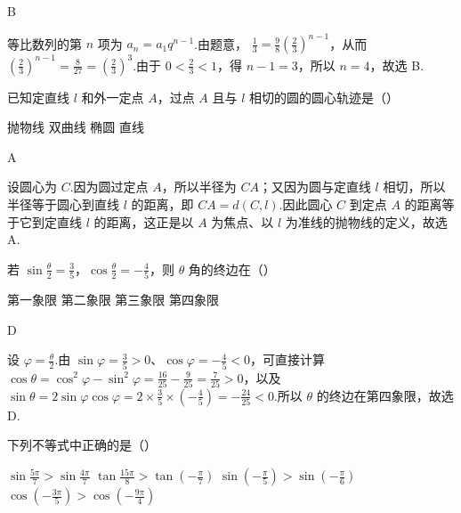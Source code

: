 \documentclass[UTF8,a4paper,oneside,11pt]{ctexbook}
\begin{document}
\begin{answer}
B
\end{answer}

\begin{solution}
等比数列的第 \(n\) 项为 \(a_n=a_1q^{n-1}\).由题意，
\(\frac{1}{3}=\frac{9}{8}\left(\frac{2}{3}\right)^{n-1}\)，从而
\(\left(\frac{2}{3}\right)^{n-1}=\frac{8}{27}=\left(\frac{2}{3}\right)^3\).由于 \(0<\frac{2}{3}<1\)，得 \(n-1=3\)，所以 \(n=4\)，故选 B.
\end{solution}

\begin{problem}

已知定直线 \(l\) 和外一定点 \(A\)，过点 \(A\) 且与 \(l\) 相切的圆的圆心轨迹是（\quad）

\choices
    {抛物线}
    {双曲线}
    {椭圆}
    {直线}
\end{problem}

\begin{answer}
A
\end{answer}

\begin{solution}
设圆心为 \(C\).因为圆过定点 \(A\)，所以半径为 \(CA\)；又因为圆与定直线 \(l\) 相切，所以半径等于圆心到直线 \(l\) 的距离，即
\(CA=d(C,l)\).因此圆心 \(C\) 到定点 \(A\) 的距离等于它到定直线 \(l\) 的距离，这正是以 \(A\) 为焦点、以 \(l\) 为准线的抛物线的定义，故选 A.
\end{solution}

\begin{problem}

若 \(\sin \frac{\theta}{2}=\frac{3}{5}\)，\(\cos \frac{\theta}{2}=-\frac{4}{5}\)，则 \(\theta\) 角的终边在（\quad）

\choices
    {第一象限}
    {第二象限}
    {第三象限}
    {第四象限}
\end{problem}

\begin{answer}
D
\end{answer}

\begin{solution}
设 \(\varphi=\frac{\theta}{2}\).由 \(\sin\varphi=\frac{3}{5}>0\)、\(\cos\varphi=-\frac{4}{5}<0\)，可直接计算
\(\cos\theta=\cos^2\varphi-\sin^2\varphi=\frac{16}{25}-\frac{9}{25}=\frac{7}{25}>0\)，以及
\(\sin\theta=2\sin\varphi\cos\varphi=2\times\frac{3}{5}\times\left(-\frac{4}{5}\right)=-\frac{24}{25}<0\).所以 \(\theta\) 的终边在第四象限，故选 D.
\end{solution}

\begin{problem}

下列不等式中正确的是（\quad）

\choices
    {\(\sin \frac{5\pi}{7}>\sin \frac{4\pi}{7}\)}
    {\(\tan\frac{15\pi}{8}>\tan\left( -\frac{\pi}{7} \right)\)}
    {\(\sin \left( -\frac{\pi}{5} \right)>\sin \left( -\frac{\pi}{6} \right)\)}
    {\(\cos \left( -\frac{3\pi}{5} \right)>\cos \left( -\frac{9\pi}{4} \right)\)}
\end{problem}
\end{document}
